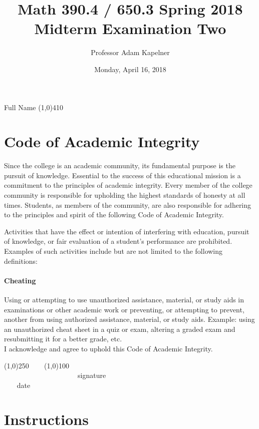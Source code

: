 \documentclass[12pt]{article}
\title{Math 390.4 / 650.3 Spring 2018 \\ Midterm Examination Two}
\author{Professor Adam Kapelner}
\date{Monday, April 16, 2018}
\begin{document}
\maketitle

\noindent Full Name \line(1,0){410}

\thispagestyle{empty}

\section*{Code of Academic Integrity}

\footnotesize
Since the college is an academic community, its fundamental purpose is the pursuit of knowledge. Essential to the success of this educational mission is a commitment to the principles of academic integrity. Every member of the college community is responsible for upholding the highest standards of honesty at all times. Students, as members of the community, are also responsible for adhering to the principles and spirit of the following Code of Academic Integrity.

Activities that have the effect or intention of interfering with education, pursuit of knowledge, or fair evaluation of a student's performance are prohibited. Examples of such activities include but are not limited to the following definitions:

\paragraph{Cheating} Using or attempting to use unauthorized assistance, material, or study aids in examinations or other academic work or preventing, or attempting to prevent, another from using authorized assistance, material, or study aids. Example: using an unauthorized cheat sheet in a quiz or exam, altering a graded exam and resubmitting it for a better grade, etc.
\\

\noindent I acknowledge and agree to uphold this Code of Academic Integrity. \\

\begin{center}
\line(1,0){250} ~~~ \line(1,0){100}\\
~~~~~~~~~~~~~~~~~~~~~signature~~~~~~~~~~~~~~~~~~~~~~~~~~~~~~~~~~~~~~~~~~~~~ date
\end{center}

\normalsize

\section*{Instructions}
\end{document}
